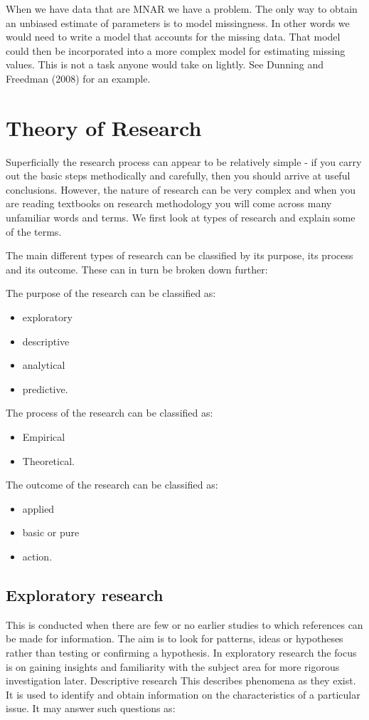 \documentclass[12pt, a4paper]{report}
\begin{document}
When we have data that are MNAR we have a problem. The only way to obtain an unbiased estimate of parameters is to model missingness. In other words we would need to write a model that accounts for the missing data. That model could then be incorporated into a more complex model for estimating missing values. This is not a task anyone would take on lightly. See Dunning and Freedman (2008) for an example.


\section{Theory of Research}
Superficially the research process can appear to be relatively simple - if you carry out the basic steps methodically and carefully, then you should arrive at useful conclusions. However, the nature of research can be very complex and when you are reading textbooks on research methodology you will come across many unfamiliar words and terms. We first look at types of research and explain some of the terms.

The main different types of research can be classified by its purpose, its process and its outcome. These can in turn be broken down further:

The purpose of the research can be classified as:
\begin{itemize}
\item exploratory
\item descriptive
\item analytical
\item predictive.
\end{itemize}
The process of the research can be classified as:
\begin{itemize}\item Empirical
\item Theoretical.
\end{itemize}
The outcome of the research can be classified as:
\begin{itemize}\item applied
\item basic or pure
\item action.
\end{itemize}
\subsection{Exploratory research}
This is conducted when there are few or no earlier studies to which references can be made for information. The aim is to look for patterns, ideas or hypotheses rather than testing or confirming a hypothesis. In exploratory research the focus is on gaining insights and familiarity with the subject area for more rigorous investigation later.
Descriptive research
This describes phenomena as they exist. It is used to identify and obtain information on the characteristics of a particular issue. It may answer such questions as:
\end{document}
